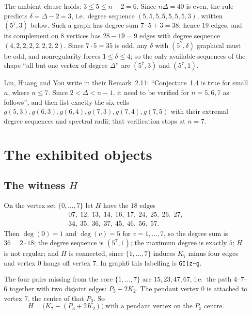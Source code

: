 \documentclass[11pt]{amsart}
\theoremstyle{definition}
\begin{document}
The ambient clause holds: $3\le 5\le n-2=6$. Since $n\Delta=40$ is even, the
rule predicts $\delta=\Delta-2=3$, i.e.\ degree sequence
$(5,5,5,5,5,5,5,3)$, written $(5^7,3)$ below. Such a graph has degree sum
$7\cdot 5+3=38$, hence $19$ edges, and its complement on $8$ vertices has
$28-19=9$ edges with degree sequence $(4,2,2,2,2,2,2,2)$. Since $7\cdot5=35$ is
odd, any $\delta$ with $(5^7,\delta)$ graphical must be odd, and nonregularity
forces $1\le\delta\le 4$; so the only available sequences of the shape ``all but
one vertex of degree $\Delta$'' are $(5^7,3)$ and $(5^7,1)$.

Liu, Huang and You \cite{LHY2009} write in their Remark~2.11:
``Conjecture~1.4 is true for small $n$, where $n\le 7$. Since $2<\Delta<n-1$, it
need to be verified for $n=5,6,7$ as follows'', and then list exactly the six
cells $g(5,3),g(6,3),g(6,4),g(7,3),g(7,4),g(7,5)$ with their extremal degree
sequences and spectral radii; that verification stops at $n=7$.

\section{The exhibited objects}

\subsection{The witness \texorpdfstring{$H$}{H}}
On the vertex set $\{0,\dots,7\}$ let $H$ have the $18$ edges
\[
\begin{array}{l}
07,\;12,\;13,\;14,\;16,\;17,\;24,\;25,\;26,\;27,\\
34,\;35,\;36,\;37,\;45,\;46,\;56,\;57 .
\end{array}
\]
Then $\deg(0)=1$ and $\deg(v)=5$ for $v=1,\dots,7$, so the degree sum is
$36=2\cdot 18$; the degree sequence is $(5^7,1)$; the maximum degree is exactly
$5$; $H$ is not regular; and $H$ is connected, since $\{1,\dots,7\}$ induces
$K_7$ minus four edges and vertex $0$ hangs off vertex $7$. In graph6 this
labelling is \texttt{GI[z\textasciitilde{}g}.

The four pairs missing from the core $\{1,\dots,7\}$ are $15,23,47,67$, i.e.\ the
path $4$--$7$--$6$ together with two disjoint edges: $P_3+2K_2$. The pendant
vertex $0$ is attached to vertex $7$, the centre of that $P_3$. So
\[
H=\bigl(K_7-(P_3+2K_2)\bigr)\ \text{with a pendant vertex on the $P_3$ centre}.
\]
\end{document}
